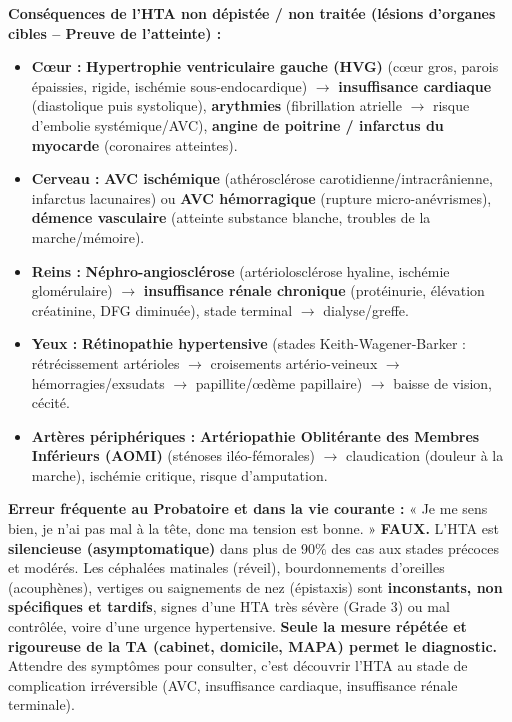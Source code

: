 \documentclass[11pt]{article}
\begin{document}
\noindent \textbf{Conséquences de l'HTA non dépistée / non traitée (lésions d'organes cibles -- Preuve de l'atteinte) :}
\begin{itemize}
    \item \textbf{Cœur :} \textbf{Hypertrophie ventriculaire gauche (HVG)} (cœur gros, parois épaissies, rigide, ischémie sous-endocardique) $\rightarrow$ \textbf{insuffisance cardiaque} (diastolique puis systolique), \textbf{arythmies} (fibrillation atrielle $\rightarrow$ risque d'embolie systémique/AVC), \textbf{angine de poitrine / infarctus du myocarde} (coronaires atteintes).
    \item \textbf{Cerveau :} \textbf{AVC ischémique} (athérosclérose carotidienne/intracrânienne, infarctus lacunaires) ou \textbf{AVC hémorragique} (rupture micro-anévrismes), \textbf{démence vasculaire} (atteinte substance blanche, troubles de la marche/mémoire).
    \item \textbf{Reins :} \textbf{Néphro-angiosclérose} (artériolosclérose hyaline, ischémie glomérulaire) $\rightarrow$ \textbf{insuffisance rénale chronique} (protéinurie, élévation créatinine, DFG diminuée), stade terminal $\rightarrow$ dialyse/greffe.
    \item \textbf{Yeux :} \textbf{Rétinopathie hypertensive} (stades Keith-Wagener-Barker : rétrécissement artérioles $\rightarrow$ croisements artério-veineux $\rightarrow$ hémorragies/exsudats $\rightarrow$ papillite/œdème papillaire) $\rightarrow$ baisse de vision, cécité.
    \item \textbf{Artères périphériques :} \textbf{Artériopathie Oblitérante des Membres Inférieurs (AOMI)} (sténoses iléo-fémorales) $\rightarrow$ claudication (douleur à la marche), ischémie critique, risque d'amputation.
\end{itemize}

\begin{attention}
\textbf{Erreur fréquente au Probatoire et dans la vie courante :} « Je me sens bien, je n'ai pas mal à la tête, donc ma tension est bonne. » \textbf{FAUX.} L'HTA est \textbf{silencieuse (asymptomatique)} dans plus de 90\% des cas aux stades précoces et modérés. Les céphalées matinales (réveil), bourdonnements d'oreilles (acouphènes), vertiges ou saignements de nez (épistaxis) sont \textbf{inconstants, non spécifiques et tardifs}, signes d'une HTA très sévère (Grade 3) ou mal contrôlée, voire d'une urgence hypertensive. \textbf{Seule la mesure répétée et rigoureuse de la TA (cabinet, domicile, MAPA) permet le diagnostic.} Attendre des symptômes pour consulter, c'est découvrir l'HTA au stade de complication irréversible (AVC, insuffisance cardiaque, insuffisance rénale terminale).
\end{attention}
\end{document}

